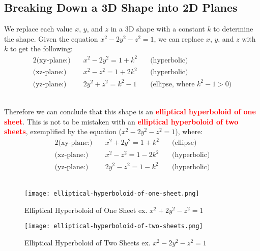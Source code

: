 \documentclass{article}
\begin{document}
\subsection{Breaking Down a 3D Shape into 2D Planes}
We replace each value \(x\), \(y\), and \(z\) in a 3D shape with a constant \(k\) to determine the shape.
Given the equation \(x^2 - 2y^2 - z^2 = 1\), we can replace \(x\), \(y\), and \(z\) with \(k\) to get the following:
\begin{alignat}{2}
    \text{(xy-plane:)} \quad & x^2 - 2y^2 = 1 + k^2 \quad & \text{(hyperbolic)} \\
    \text{(xz-plane:)} \quad & x^2 - z^2 = 1 + 2k^2 \quad & \text{(hyperbolic)} \\
    \text{(yz-plane:)} \quad & 2y^2 + z^2 = k^2 - 1 \quad & \text{(ellipse, where \(k^2 - 1 > 0\))}
\end{alignat} \\
\newline

Therefore we can conclude that this shape is an \textbf{\textcolor{red}{elliptical hyperboloid of one sheet}}. This is not to be mistaken with an \textbf{\textcolor{red}{elliptical hyperboloid of two sheets}}, exemplified by the equation ($x^2 - 2y^2 - z^2 = 1$), where:
\begin{alignat}{2}
    \text{(xy-plane:)} \quad & x^2 + 2y^2 = 1 + k^2 \quad & \text{(ellipse)} \\
    \text{(xz-plane:)} \quad & x^2 - z^2 = 1 - 2k^2 \quad & \text{(hyperbolic)} \\
    \text{(yz-plane:)} \quad & 2y^2 - z^2 = 1 - k^2 \quad & \text{(hyperbolic)}
\end{alignat} \\
\begin{figure}[h]
    \centering
    \begin{minipage}{0.45\textwidth}
        \centering
        \texttt{[image: elliptical-hyperboloid-of-one-sheet.png]}
        \caption{\centering Elliptical Hyperboloid of One Sheet 
        ex. $x^2 + 2y^2 - z^2 = 1$}
    \end{minipage}\hfill
    \begin{minipage}{0.45\textwidth}
        \centering
        \texttt{[image: elliptical-hyperboloid-of-two-sheets.png]}
        \caption{\centering Elliptical Hyperboloid of Two Sheets
        ex. $x^2 - 2y^2 - z^2 = 1$}
    \end{minipage}
\end{figure}
\end{document}
